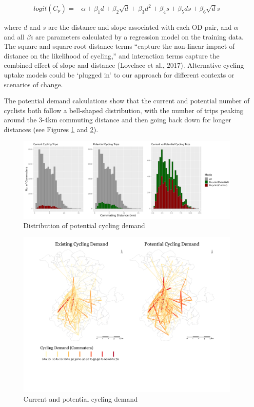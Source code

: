 \documentclass[
]{article}
\begin{document}
\begin{align}\label{eq:pcteqn}
     logit(C_{p}) = & \alpha + \beta_1 d + \beta_2 \sqrt{d} + \beta_3 d^2 + \beta_4 s + \beta_5 ds + \beta_6 \sqrt{d}s 
\end{align}

\noindent where \(d\) and \(s\) are the distance and slope associated with each
OD pair, and \(\alpha\) and all \(\beta\)s are parameters calculated by a regression
model on the training data. The square and square-root distance terms
``capture the non-linear impact of distance on the likelihood of
cycling,'' and interaction terms capture the combined effect of slope
and distance (Lovelace et al., 2017). Alternative cycling uptake
models could be `plugged in' to our approach for different contexts or scenarios of change.

The potential demand calculations show that the current and potential
number of cyclists both follow a bell-shaped distribution, with the
number of trips peaking around the 3-4km commuting distance and then
going back down for longer distances (see Figures
\ref{fig:potdemhistograms} and \ref{fig:desirefacetcycling}).

\begin{figure}

{\centering \includegraphics[width=0.9\linewidth]{data/Manchester/Plots/histogram_distance_cycling_potential_current_all} 

}

\caption{Distribution of potential cycling demand}\label{fig:potdemhistograms}
\end{figure}

\begin{figure}[H]

{\centering \includegraphics[width=0.65\linewidth]{data/Manchester/Plots/desire_facet_cycling} 

}

\caption{Current and potential cycling demand}\label{fig:desirefacetcycling}
\end{figure}
\end{document}
